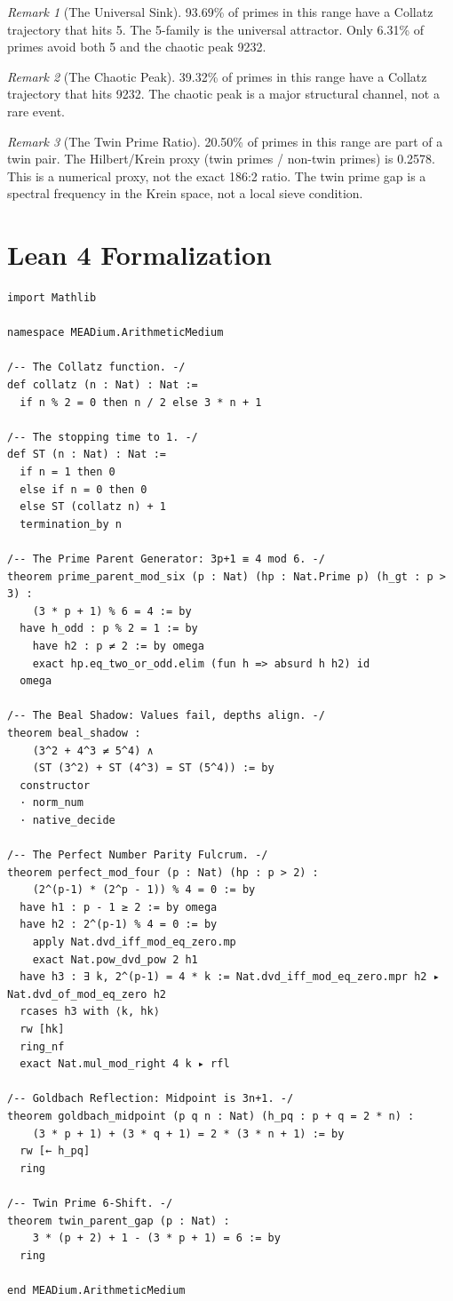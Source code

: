 \documentclass[11pt]{article}
\theoremstyle{definition}
\theoremstyle{remark}
\newtheorem{remark}{Remark}
\begin{document}
\begin{remark}[The Universal Sink]
93.69\% of primes in this range have a Collatz trajectory that hits 5. The 5-family is the universal attractor. Only 6.31\% of primes avoid both 5 and the chaotic peak 9232.
\end{remark}

\begin{remark}[The Chaotic Peak]
39.32\% of primes in this range have a Collatz trajectory that hits 9232. The chaotic peak is a major structural channel, not a rare event.
\end{remark}

\begin{remark}[The Twin Prime Ratio]
20.50\% of primes in this range are part of a twin pair. The Hilbert/Krein proxy (twin primes / non-twin primes) is 0.2578. This is a numerical proxy, not the exact 186:2 ratio. The twin prime gap is a spectral frequency in the Krein space, not a local sieve condition.
\end{remark}
\section{Lean 4 Formalization}

\begin{lstlisting}[style=lean]
import Mathlib

namespace MEADium.ArithmeticMedium

/-- The Collatz function. -/
def collatz (n : Nat) : Nat :=
  if n % 2 = 0 then n / 2 else 3 * n + 1

/-- The stopping time to 1. -/
def ST (n : Nat) : Nat :=
  if n = 1 then 0 
  else if n = 0 then 0
  else ST (collatz n) + 1
  termination_by n

/-- The Prime Parent Generator: 3p+1 ≡ 4 mod 6. -/
theorem prime_parent_mod_six (p : Nat) (hp : Nat.Prime p) (h_gt : p > 3) :
    (3 * p + 1) % 6 = 4 := by
  have h_odd : p % 2 = 1 := by
    have h2 : p ≠ 2 := by omega
    exact hp.eq_two_or_odd.elim (fun h => absurd h h2) id
  omega

/-- The Beal Shadow: Values fail, depths align. -/
theorem beal_shadow :
    (3^2 + 4^3 ≠ 5^4) ∧
    (ST (3^2) + ST (4^3) = ST (5^4)) := by
  constructor
  · norm_num
  · native_decide

/-- The Perfect Number Parity Fulcrum. -/
theorem perfect_mod_four (p : Nat) (hp : p > 2) :
    (2^(p-1) * (2^p - 1)) % 4 = 0 := by
  have h1 : p - 1 ≥ 2 := by omega
  have h2 : 2^(p-1) % 4 = 0 := by
    apply Nat.dvd_iff_mod_eq_zero.mp
    exact Nat.pow_dvd_pow 2 h1
  have h3 : ∃ k, 2^(p-1) = 4 * k := Nat.dvd_iff_mod_eq_zero.mpr h2 ▸ Nat.dvd_of_mod_eq_zero h2
  rcases h3 with ⟨k, hk⟩
  rw [hk]
  ring_nf
  exact Nat.mul_mod_right 4 k ▸ rfl

/-- Goldbach Reflection: Midpoint is 3n+1. -/
theorem goldbach_midpoint (p q n : Nat) (h_pq : p + q = 2 * n) :
    (3 * p + 1) + (3 * q + 1) = 2 * (3 * n + 1) := by
  rw [← h_pq]
  ring

/-- Twin Prime 6-Shift. -/
theorem twin_parent_gap (p : Nat) :
    3 * (p + 2) + 1 - (3 * p + 1) = 6 := by
  ring

end MEADium.ArithmeticMedium
\end{lstlisting}
\end{document}

